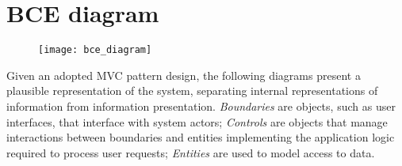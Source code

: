 \section{BCE diagram}
\label{subsect:BCE diagram}
	\begin{figure}[H]
	\vspace*{-55px}
		\texttt{[image: bce\_diagram]}
		\centering
	\end{figure}
	Given an adopted MVC pattern design, the following diagrams present a plausible representation of the system, separating internal representations of information from information presentation. \textit{Boundaries} are objects, such as user interfaces, that interface with system actors; \textit{Controls} are objects that manage interactions between
boundaries and entities implementing the application logic required to process
user requests; \textit{Entities} are used to model access to data.